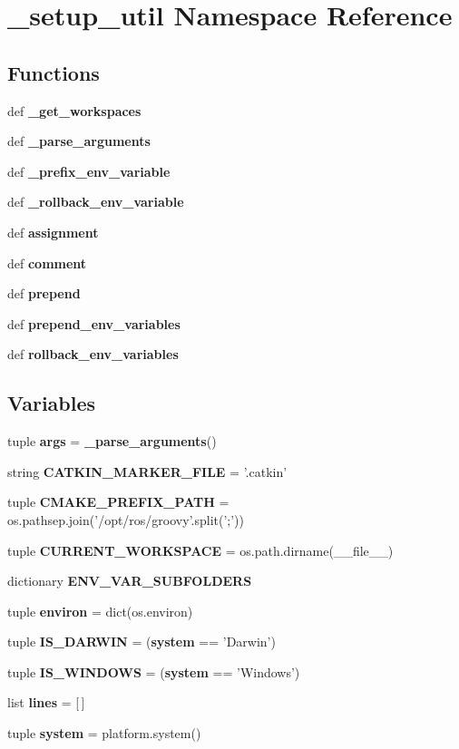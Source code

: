 \section{\-\_\-setup\-\_\-util \-Namespace \-Reference}
\label{namespace__setup__util}
\subsection*{\-Functions}
\begin{DoxyCompactItemize}
\item 
def {\bf \-\_\-get\-\_\-workspaces}
\item 
def {\bf \-\_\-parse\-\_\-arguments}
\item 
def {\bf \-\_\-prefix\-\_\-env\-\_\-variable}
\item 
def {\bf \-\_\-rollback\-\_\-env\-\_\-variable}
\item 
def {\bf assignment}
\item 
def {\bf comment}
\item 
def {\bf prepend}
\item 
def {\bf prepend\-\_\-env\-\_\-variables}
\item 
def {\bf rollback\-\_\-env\-\_\-variables}
\end{DoxyCompactItemize}
\subsection*{\-Variables}
\begin{DoxyCompactItemize}
\item 
tuple {\bf args} = {\bf \-\_\-parse\-\_\-arguments}()
\item 
string {\bf \-C\-A\-T\-K\-I\-N\-\_\-\-M\-A\-R\-K\-E\-R\-\_\-\-F\-I\-L\-E} = '.catkin'
\item 
tuple {\bf \-C\-M\-A\-K\-E\-\_\-\-P\-R\-E\-F\-I\-X\-\_\-\-P\-A\-T\-H} = os.\-pathsep.\-join('/opt/ros/groovy'.split(';'))
\item 
tuple {\bf \-C\-U\-R\-R\-E\-N\-T\-\_\-\-W\-O\-R\-K\-S\-P\-A\-C\-E} = os.\-path.\-dirname(\-\_\-\-\_\-file\-\_\-\-\_\-)
\item 
dictionary {\bf \-E\-N\-V\-\_\-\-V\-A\-R\-\_\-\-S\-U\-B\-F\-O\-L\-D\-E\-R\-S}
\item 
tuple {\bf environ} = dict(os.\-environ)
\item 
tuple {\bf \-I\-S\-\_\-\-D\-A\-R\-W\-I\-N} = ({\bf system} == '\-Darwin')
\item 
tuple {\bf \-I\-S\-\_\-\-W\-I\-N\-D\-O\-W\-S} = ({\bf system} == '\-Windows')
\item 
list {\bf lines} = [$\,$]
\item 
tuple {\bf system} = platform.\-system()
\end{DoxyCompactItemize}


